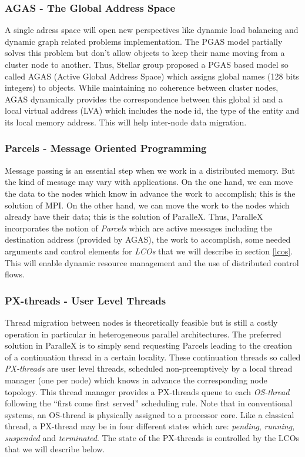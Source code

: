 \documentclass[smallextended]{svjour3}
\begin{document}
\subsubsection{AGAS - The Global Address Space}
A single adress space will open new perspectives like dynamic load balancing and dynamic graph related problems implementation. The PGAS model \cite{PGAS} partially solves this problem but don't allow objects to keep their name moving from a cluster node to another. Thus, Stellar group proposed a PGAS based model so called AGAS (Active Global Address Space) \cite{ParalleX} which assigns
global names (128 bits integers) to objects. While maintaining no coherence between cluster nodes, AGAS dynamically provides the correspondence between this global id and a local virtual address (LVA) \cite{ParalleX} which includes the node id, the type of the entity and its local memory address. This will help inter-node data migration.

\subsubsection{Parcels - Message Oriented Programming}
Message passing is an essential step when we work in a distributed memory. But the kind of message may vary with applications. On the one hand, we can move the data to the nodes which know in advance the work to accomplish; this is the solution of MPI. On the other hand, we can move the work to the nodes which already have their data; this is the solution of ParalleX. Thus, ParalleX incorporates the notion of \emph{Parcels} \cite{ParalleX} which are active messages including the destination address (provided by AGAS), the work to accomplish, some needed arguments and control elements for \emph{LCOs} that we will describe in section \ref{lcos}. This will enable dynamic resource
management and the use of distributed control flows.

\subsubsection{PX-threads - User Level Threads}
Thread migration between nodes is theoretically feasible but is still a costly operation in particular in heterogeneous parallel architectures. The preferred solution in ParalleX is to simply send requesting Parcels leading to the creation of a continuation thread in a certain locality. These continuation threads so called \emph{PX-threads} \cite{ParalleX} are user level threads, scheduled non-preemptively by a local thread manager (one per node) which knows in advance the corresponding node topology. This thread manager provides a PX-threads queue to each \emph{OS-thread} \cite{ParalleX} following the \enquote{first come first served} scheduling rule. Note that in conventional systems, an OS-thread is physically assigned to a processor core. Like a classical thread, a PX-thread may be in four different states which are: \emph{pending}, \emph{running}, \emph{suspended} and \emph{terminated}. The state of the PX-threads is controlled by the LCOs that we will describe below.
\end{document}
